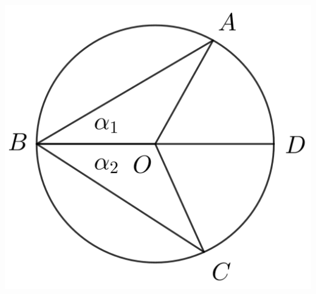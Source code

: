 \documentclass[12pt,a4paper]{article}
\begin{document}
\begin{center}
\includegraphics[scale=0.6]{Imagenes/circulo 1.png} 
\end{center} 
\end{document}
